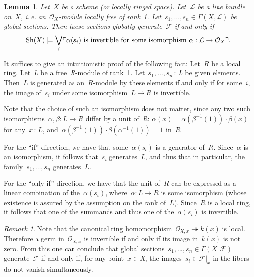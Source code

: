 \documentclass[10pt,reqno,a4paper]{amsbook}
\makeatletter
\theoremstyle{definition}
\theoremstyle{plain}
\newtheorem{lemma}[defn]{Lemma}
\theoremstyle{remark}
\newtheorem{rem}[defn]{Remark}
\newcommand{\F}{\mathcal{F}}
\renewcommand{\O}{\mathcal{O}}
\renewcommand{\L}{\mathcal{L}}
\newcommand{\Sh}{\mathrm{Sh}}
\newcommand{\?}{\,{:}\,}
\renewcommand{\_}{\mathpunct{.}\,}
\newcommand{\speak}[1]{\ulcorner\text{\textnormal{#1}}\urcorner}
\newcommand{\ie}{i.\,e.\@\xspace}
\renewenvironment{proof}[1][\proofname]{\par
  \pushQED{\qed}%
  \normalfont \topsep6\p@\@plus6\p@\relax
  \trivlist
  \item[\hskip\labelsep
        \itshape
    #1\@addpunct{.}]\ignorespaces
}{%
  \popQED\endtrivlist\@endpefalse
}
\makeatother
\begin{document}
\begin{lemma}Let~$X$ be a scheme (or locally ringed space). Let~$\L$ be a line
bundle on~$X$, \ie an~$\O_X$-module locally free of rank~1.
Let~$s_1,\ldots,s_n \in \Gamma(X,\L)$ be global sections. Then these sections
globally generate~$\F$ if and only if
\[ \Sh(X) \models \bigvee_i \speak{$\alpha(s_i)$ is invertible for some
isomorphism~$\alpha : \L \to \O_X$}. \]
\end{lemma}
\begin{proof}It suffices to give an intuitionistic proof of the following fact:
Let~$R$ be a local ring. Let~$L$ be a free~$R$-module of rank~1.
Let~$s_1,\ldots,s_n\?L$ be given elements. Then~$L$ is generated as
an~$R$-module by these elements if and only if for some~$i$, the image of~$s_i$
under some isomorphism~$L \to R$ is invertible.

Note that the choice of such an isomorphism does not matter, since any two such
isomorphisms~$\alpha, \beta : L \to R$ differ by a unit of~$R$: $\alpha(x) =
\alpha(\beta^{-1}(1)) \cdot \beta(x)$ for any~$x\?L$,
and~$\alpha(\beta^{-1}(1)) \cdot \beta(\alpha^{-1}(1)) = 1$ in~$R$.

For the ``if'' direction, we have that some~$\alpha(s_i)$ is a generator
of~$R$. Since~$\alpha$ is an isomorphism, it follows that~$s_i$ generates~$L$,
and thus that in particular, the family~$s_1,\ldots,s_n$ generates~$L$.

For the ``only if'' direction, we have that the unit of~$R$ can be expressed as
a linear combination of the~$\alpha(s_i)$, where~$\alpha : L \to R$ is some
isomorphism (whose existence is assured by the assumption on the rank of~$L$).
Since~$R$ is a local ring, it follows that one of the summands and thus one of
the~$\alpha(s_i)$ is invertible.
\end{proof}

\begin{rem}Note that the canonical ring homomorphism~$\O_{X,x}
\twoheadrightarrow k(x)$ is local. Therefore a germ in~$\O_{X,x}$ is invertible
if and only if its image in~$k(x)$ is not zero. From this one can conclude that
global sections~$s_1,\ldots,s_n \in \Gamma(X,\F)$ generate~$\F$ if and only if,
for any point~$x \in X$, the images~$s_i \in \F|_x$ in the fibers do not vanish
simultaneously.
\end{rem}
\end{document}
